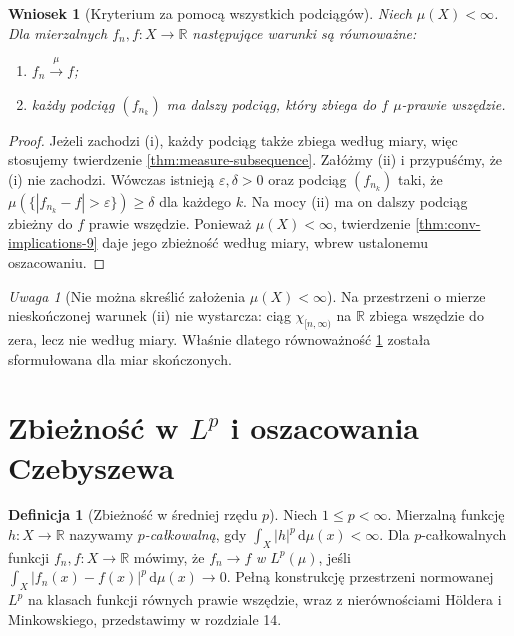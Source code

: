\documentclass[11pt,a4paper,oneside]{book}
\numberwithin{equation}{chapter}
\theoremstyle{plain}
\newtheorem{wniosek}[twierdzenie]{Wniosek}
\theoremstyle{definition}
\newtheorem{definicja}[twierdzenie]{Definicja}
\theoremstyle{remark}
\newtheorem{uwaga}[twierdzenie]{Uwaga}
\begin{document}
\begin{wniosek}[Kryterium za pomocą wszystkich podciągów]
\label{cor:every-subseq-9}
Niech $\mu(X)<\infty$. Dla mierzalnych
$f_n,f:X\to\mathbb R$ następujące
warunki są równoważne:
\begin{enumerate}[label=\textup{(\roman*)}]
\item $f_n\xrightarrow{\mu}f$;
\item każdy podciąg $(f_{n_k})$ ma dalszy podciąg,
który zbiega do $f$ $\mu$-prawie wszędzie.
\end{enumerate}
\end{wniosek}
\begin{proof}
Jeżeli zachodzi (i), każdy podciąg także zbiega
według miary, więc stosujemy twierdzenie
\ref{thm:measure-subsequence}.
Załóżmy (ii) i przypuśćmy, że (i) nie zachodzi.
Wówczas istnieją $\varepsilon,\delta>0$ oraz
podciąg $(f_{n_k})$ taki, że
$\mu(\{|f_{n_k}-f|>\varepsilon\})\ge\delta$
dla każdego $k$. Na mocy (ii) ma on dalszy
podciąg zbieżny do $f$ prawie wszędzie.
Ponieważ $\mu(X)<\infty$, twierdzenie
\ref{thm:conv-implications-9} daje jego zbieżność
według miary, wbrew ustalonemu oszacowaniu.
\end{proof}

\begin{uwaga}[Nie można skreślić założenia $\mu(X)<\infty$]
Na przestrzeni o mierze nieskończonej warunek (ii)
nie wystarcza: ciąg $\chi_{[n,\infty)}$ na
$\mathbb R$ zbiega wszędzie do zera, lecz nie
według miary. Właśnie dlatego równoważność
\ref{cor:every-subseq-9} została sformułowana
dla miar skończonych.
\end{uwaga}

\section{Zbieżność w $L^p$ i oszacowania Czebyszewa}

\begin{definicja}[Zbieżność w średniej rzędu $p$]
\label{def:lp-convergence-9}
Niech $1\le p<\infty$. Mierzalną funkcję
$h:X\to\mathbb R$ nazywamy \emph{$p$-całkowalną},
gdy $\int_X|h|^p\,\mathrm d\mu(x)<\infty$.
Dla $p$-całkowalnych funkcji $f_n,f:X\to\mathbb R$
mówimy, że $f_n\to f$ \emph{w $L^p(\mu)$}, jeśli
$\int_X|f_n(x)-f(x)|^p\,\mathrm d\mu(x)\to0$.
Pełną konstrukcję przestrzeni normowanej $L^p$
na klasach funkcji równych prawie wszędzie,
wraz z nierównościami H\"oldera i Minkowskiego,
przedstawimy w rozdziale 14.
\end{definicja}
\end{document}
